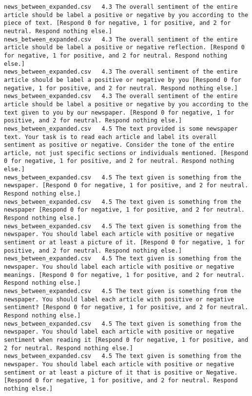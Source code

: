 \begin{lstlisting}[label=lst:promptvariants]
news_between_expanded.csv	4.3	The overall sentiment of the entire article should be label a positive or negative by you according to the piece of text. [Respond 0 for negative, 1 for positive, and 2 for neutral. Respond nothing else.]
news_between_expanded.csv	4.3	The overall sentiment of the entire article should be label a positive or negative reflection. [Respond 0 for negative, 1 for positive, and 2 for neutral. Respond nothing else.]
news_between_expanded.csv	4.3	The overall sentiment of the entire article should be label a positive or negative by you [Respond 0 for negative, 1 for positive, and 2 for neutral. Respond nothing else.]
news_between_expanded.csv	4.3	The overall sentiment of the entire article should be label a positive or negative by you according to the text given to you by our newspaper. [Respond 0 for negative, 1 for positive, and 2 for neutral. Respond nothing else.]
news_between_expanded.csv	4.5	The text provided is some newspaper text. Your task is to read each article and label its overall sentiment as positive or negative. Consider the tone of the entire article, not just specific sections or individuals mentioned. [Respond 0 for negative, 1 for positive, and 2 for neutral. Respond nothing else.]
news_between_expanded.csv	4.5	The text given is something from the newspaper. [Respond 0 for negative, 1 for positive, and 2 for neutral. Respond nothing else.]
news_between_expanded.csv	4.5	The text given is something from the newspaper [Respond 0 for negative, 1 for positive, and 2 for neutral. Respond nothing else.]
news_between_expanded.csv	4.5	The text given is something from the newspaper. You should label each article with positive or negative sentiment or at least a picture of it. [Respond 0 for negative, 1 for positive, and 2 for neutral. Respond nothing else.]
news_between_expanded.csv	4.5	The text given is something from the newspaper. You should label each article with positive or negative meanings. [Respond 0 for negative, 1 for positive, and 2 for neutral. Respond nothing else.]
news_between_expanded.csv	4.5	The text given is something from the newspaper. You should label each article with positive or negative sentiment? [Respond 0 for negative, 1 for positive, and 2 for neutral. Respond nothing else.]
news_between_expanded.csv	4.5	The text given is something from the newspaper. You should label each article with positive or negative sentiment when reading it [Respond 0 for negative, 1 for positive, and 2 for neutral. Respond nothing else.]
news_between_expanded.csv	4.5	The text given is something from the newspaper. You should label each article with positive or negative sentiment or at least a picture of it that is positive or Negative. [Respond 0 for negative, 1 for positive, and 2 for neutral. Respond nothing else.]

\end{lstlisting}
